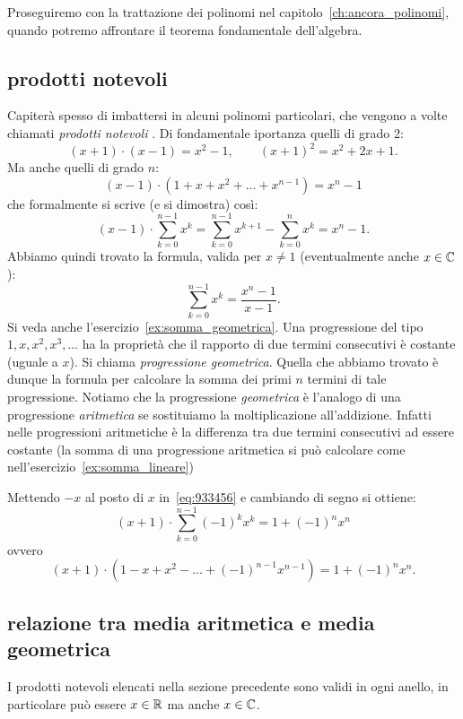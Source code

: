 Proseguiremo con la trattazione dei polinomi 
nel capitolo~\ref{ch:ancora_polinomi}, 
quando potremo affrontare il teorema fondamentale dell'algebra.

\subsection{prodotti notevoli}
\label{sec:prodotti_notevoli}

Capiterà spesso di imbattersi in alcuni polinomi particolari, che vengono 
a volte chiamati \emph{prodotti notevoli}%
%
. 
Di fondamentale iportanza quelli di grado 2:
\[
  (x+1)\cdot(x-1) = x^2-1, \qquad (x+1)^2 = x^2+2x + 1.
\]
Ma anche quelli di grado $n$:
\[
(x-1)\cdot(1+x+x^2+\dots + x^{n-1}) = x^n - 1
\]
che formalmente si scrive (e si dimostra) così:
\begin{equation}\label{eq:933456}
  (x-1)\cdot \sum_{k=0}^{n-1} x^k
  = \sum_{k=0}^{n-1} x^{k+1} - \sum_{k=0}^n x^k = x^n - 1.
\end{equation}
Abbiamo quindi trovato la formula, valida per $x\neq 1$
(eventualmente anche $x\in {\mathbb C}$):
\[
  \sum_{k=0}^{n-1} x^k = \frac{x^n-1}{x-1}.
\]
Si veda anche l'esercizio~\ref{ex:somma_geometrica}.
Una progressione del tipo $1,x,x^2,x^3,\dots$ ha la proprietà 
che il rapporto di due termini consecutivi è costante (uguale a $x$).
Si chiama \emph{progressione geometrica}.
%
%
Quella che abbiamo 
trovato è dunque la formula per calcolare la somma dei primi $n$ termini di 
tale progressione.
Notiamo che la progressione \emph{geometrica} è l'analogo di una progressione
\emph{aritmetica} se sostituiamo la moltiplicazione all'addizione.
Infatti nelle progressioni aritmetiche è la differenza tra due termini consecutivi 
ad essere costante 
(la somma di una progressione aritmetica si può calcolare come 
nell'esercizio~\ref{ex:somma_lineare})


Mettendo $-x$ al posto di $x$ in~\eqref{eq:933456} 
e cambiando di segno si ottiene:
\[
  (x+1)\cdot \sum_{k=0}^{n-1} (-1)^k x^k
  = 1 + (-1)^n x^n
\]
ovvero
\[
(x+1)\cdot (1-x+x^2- \dots + (-1)^{n-1} x^{n-1}) = 1 + (-1)^n x^n.
\]

\subsection{relazione tra media aritmetica e media geometrica}

I prodotti notevoli elencati nella sezione precedente sono validi 
in ogni anello, in particolare può essere $x\in {\mathbb R}$ ma anche $x \in {\mathbb C}$.

